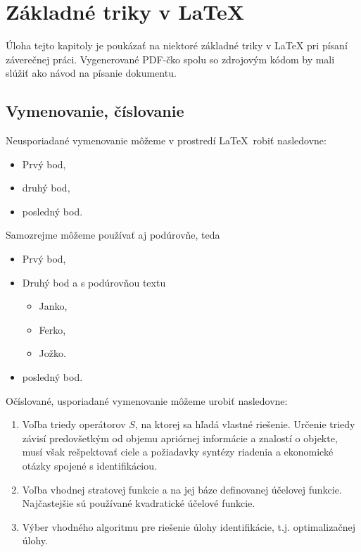 \chapter{Základné triky v LaTeX}
\label{jablka}


Úloha tejto kapitoly je poukázať na niektoré základné triky v LaTeX pri písaní záverečnej práci. Vygenerované PDF-čko spolu so zdrojovým kódom by mali slúžiť ako návod na písanie dokumentu.


\section{Vymenovanie, číslovanie}

Neusporiadané vymenovanie môžeme v prostredí \LaTeX\ robiť nasledovne:
\begin{itemize}
\item Prvý bod,
\item druhý bod,
\item posledný bod.
\end{itemize}
Samozrejme môžeme používať aj podúrovňe, teda
\begin{itemize}
\item Prvý bod,
\item Druhý bod a s podúrovňou textu
\begin{itemize}
 \item Janko,
 \item Ferko,
 \item Jožko.
\end{itemize}
\item posledný bod.
\end{itemize}

Očíslované, usporiadané vymenovanie môžeme urobiť nasledovne:
\begin{enumerate}
  \item Voľba triedy operátorov $S$, na ktorej sa hľadá vlastné riešenie. Určenie triedy závisí predovšetkým od objemu apriórnej informácie a znalostí o objekte, musí však rešpektovať ciele a požiadavky syntézy riadenia a ekonomické otázky spojené s identifikáciou.
  \item Voľba vhodnej stratovej funkcie a na jej báze definovanej účelovej funkcie. Najčastejšie sú používané kvadratické účelové funkcie.
  \item Výber vhodného algoritmu pre riešenie úlohy identifikácie, t.j. optimalizačnej úlohy.
\end{enumerate}


